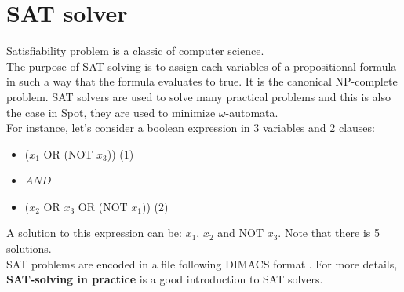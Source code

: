 \section{SAT solver}
Satisfiability problem is a classic of computer science.\\

The purpose of SAT solving is to assign each variables of a propositional formula in such a way that the
formula evaluates to true. It is the canonical NP-complete problem. SAT solvers are used to solve many
practical problems and this is also the case in Spot, they are used to minimize $\omega$-automata.\\

For instance, let's consider a boolean expression in 3 variables and 2 clauses:
\begin{itemize}
 \item[] ($x_1$ OR (NOT $x_3$)) (1)
 \item[] $AND$
 \item[] ($x_2$ OR $x_3$ OR (NOT $x_1$)) (2)
\end{itemize}

A solution to this expression can be: $x_1$, $x_2$ and NOT $x_3$. Note that there is 5 solutions.\\

\noindent SAT problems are encoded in a file following DIMACS format \cite{18}. For more details,
\textbf{SAT-solving in practice} \cite{16} is a good introduction to SAT solvers.
